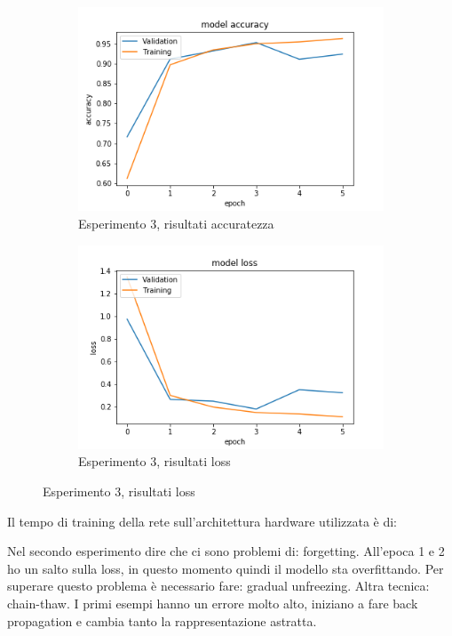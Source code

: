 \begin{figure}[H]
    \begin{subfigure}[b]{0.5\textwidth}
        \includegraphics[width=\textwidth]{./plots/exp3_p1_acc.png}
        \caption{Esperimento 3, risultati accuratezza} 
        \label{fig:plot_exp3_p1_acc}
    \end{subfigure}
    \begin{subfigure}[b]{0.5\textwidth}
        \includegraphics[width=\textwidth]{./plots/exp3_p1_loss.png}
        \caption{Esperimento 3, risultati loss} 
        \label{fig:plot_exp3_p1_loss}
	\end{subfigure}
\end{figure}

Il tempo di training della rete sull'architettura hardware utilizzata è di:


Nel secondo esperimento dire che ci sono problemi di: forgetting.
All'epoca 1 e 2 ho un salto sulla loss, in questo momento quindi il modello sta overfittando.  
Per superare questo problema è necessario fare: gradual unfreezing.  
Altra tecnica: chain-thaw.  
I primi esempi hanno un errore molto alto, iniziano a fare back propagation e cambia tanto la rappresentazione astratta.

